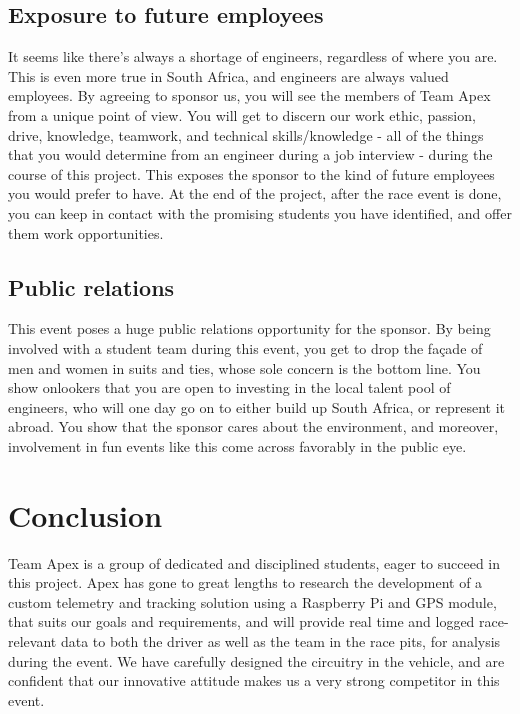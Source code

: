 \documentclass[a4paper, 12pt]{article}
\newcommand{\company}{the sponsor}
\begin{document}
		\subsection{Exposure to future employees} %
		\label{sub:exposure_to_future_employees}
			It seems like there's always a shortage of engineers, regardless of where you are. This is even more true in South Africa, and engineers are always valued employees. By agreeing to sponsor us, you will see the members of Team Apex from a unique point of view. You will get to discern our work ethic, passion, drive, knowledge, teamwork, and technical skills/knowledge - all of the things that you would determine from an engineer during a job interview - during the course of this project. This exposes \company{} to the kind of future employees you would prefer to have. At the end of the project, after the race event is done, you can keep in contact with the promising students you have identified, and offer them work opportunities.
		\subsection{Public relations} %
		\label{sub:public_relations}
			This event poses a huge public relations opportunity for \company{}. By being involved with a student team during this event, you get to drop the fa\c{c}ade of men and women in suits and ties, whose sole concern is the bottom line. You show onlookers that you are open to investing in the local talent pool of engineers, who will one day go on to either build up South Africa, or represent it abroad. You show that \company{} cares about the environment, and moreover, involvement in fun events like this come across favorably in the public eye.
	
	\section{Conclusion} %
	\label{sec:conclusion}
		Team Apex is a group of dedicated and disciplined students, eager to succeed in this project. Apex has gone to great lengths to research the development of a custom telemetry and tracking solution using a Raspberry Pi and GPS module, that suits our goals and requirements, and will provide real time and logged race-relevant data to both the driver as well as the team in the race pits, for analysis during the event. We have carefully designed the circuitry in the vehicle, and are confident that our innovative attitude makes us a very strong competitor in this event.
\end{document}
